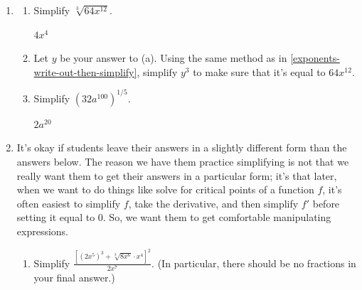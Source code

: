 \documentclass{article}
\begin{document}
\begin{enumerate}
\item  

  \begin{enumerate}
  \item
    \begin{problem}[0.25in]
      Simplify $\sqrt[3]{64 x^{12}}$.
    \end{problem}

    \begin{solution}
      $4 x^4$
    \end{solution}

  \item
    \begin{problem}[0.25in]
      Let $y$ be your answer to (a).  Using the same method as in
      \ref{exponents-write-out-then-simplify}, simplify $y^3$ to make sure
      that it's equal to $64 x^{12}$.
    \end{problem}

  \item
    \begin{problem}[0.25in]
      Simplify $\left( 32 a^{100} \right)^{1/5}$. 
    \end{problem}

    \begin{solution}
      $2 a^{20}$
    \end{solution}

  \end{enumerate}

\item  

  \begin{workshop}
    It's okay if students leave their answers in a slightly different form than the answers below. The reason we have them practice simplifying is not that we really want them to get their answers in a particular form; it's that later, when we want to do things like solve for critical points of a function $f$, it's often easiest to simplify $f$, take the derivative, and then simplify $f'$ before setting it equal to 0. So, we want them to get comfortable manipulating expressions.
  \end{workshop}

  \begin{enumerate}
  \item
    \begin{problem}[\vfill]
      Simplify
      $\displaystyle \frac{[(2 x^5)^3 + \sqrt[3]{8 x^6} \cdot
        x^4]^2}{2x^7}$. (In particular, there should be no fractions
      in your final answer.)
    \end{problem}


\end{enumerate}
\end{enumerate}
\end{document}
